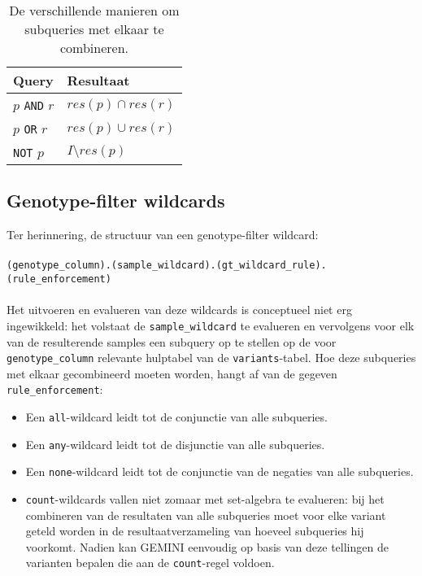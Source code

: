 \begin{table}[h]
\centering
\begin{tabular}{|l|l|}
\hline
\textbf{Query} & \textbf{Resultaat}    \\ \hline
$p$ \texttt{AND} $r$ & $res(p) \cap res(r)$   \\ \hline
$p$ \texttt{OR} $r$ & $res(p) \cup res(r)$    \\ \hline
\texttt{NOT} $p$  & $I \setminus res(p)$ \\ \hline
\end{tabular}
\caption{De verschillende manieren om subqueries met elkaar te combineren.}
\label{combineren_subqueries}
\end{table}

\subsection{Genotype-filter wildcards}

Ter herinnering, de structuur van een genotype-filter wildcard:\\\\
\texttt{(genotype\_column).(sample\_wildcard).(gt\_wildcard\_rule).(rule\_enforcement)}\\\\
Het uitvoeren en evalueren van deze wildcards is conceptueel niet erg ingewikkeld: het volstaat de \texttt{sample\_wildcard} te evalueren en vervolgens voor elk van de resulterende samples een subquery op te stellen op de voor \texttt{genotype\_column} relevante hulptabel van de \texttt{variants}-tabel. Hoe deze subqueries met elkaar gecombineerd moeten worden, hangt af van de gegeven \texttt{rule\_enforcement}:

\begin{itemize}
\item Een \texttt{all}-wildcard leidt tot de conjunctie van alle subqueries.
\item Een \texttt{any}-wildcard leidt tot de disjunctie van alle subqueries.
\item Een \texttt{none}-wildcard leidt tot de conjunctie van de negaties van alle subqueries.
\item \texttt{count}-wildcards vallen niet zomaar met set-algebra te evalueren: bij het combineren van de resultaten van alle subqueries moet voor elke variant geteld worden in de resultaatverzameling van hoeveel subqueries hij voorkomt. Nadien kan GEMINI eenvoudig op basis van deze tellingen de varianten bepalen die aan de \texttt{count}-regel voldoen.
\end{itemize}

